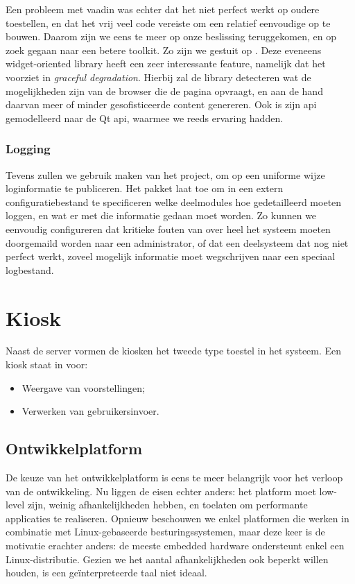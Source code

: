 Een probleem met vaadin was echter dat het niet perfect werkt op oudere toestellen, en dat het vrij veel code vereiste om een relatief eenvoudige  op te bouwen. Daarom zijn we eens te meer op onze beslissing teruggekomen, en op zoek gegaan naar een betere toolkit. Zo zijn we gestuit op . Deze eveneens widget-oriented library heeft een zeer interessante feature, namelijk dat het voorziet in \emph{graceful degradation}. Hierbij zal de library detecteren wat de mogelijkheden zijn van de browser die de pagina opvraagt, en aan de hand daarvan meer of minder gesofisticeerde content genereren. Ook is zijn \ac{api} gemodelleerd naar de Qt \ac{api}, waarmee we reeds ervaring hadden. 

\subsubsection{Logging}

Tevens zullen we gebruik maken van het  project, om op een uniforme wijze loginformatie te publiceren. Het pakket laat toe om in een extern configuratiebestand te specificeren welke deelmodules hoe gedetailleerd moeten loggen, en wat er met die informatie gedaan moet worden. Zo kunnen we eenvoudig configureren dat kritieke fouten van over heel het systeem moeten doorgemaild worden naar een administrator, of dat een deelsysteem dat nog niet perfect werkt, zoveel mogelijk informatie moet wegschrijven naar een speciaal logbestand.

\section{Kiosk}
\label{ontwerp:applicatie:kiosk}

Naast de server vormen de kiosken het tweede type toestel in het systeem. Een kiosk staat in voor:
\begin{itemize}
\item Weergave van voorstellingen;
\item Verwerken van gebruikersinvoer.
\end{itemize}

\subsection{Ontwikkelplatform}

De keuze van het ontwikkelplatform is eens te meer belangrijk voor het verloop van de ontwikkeling. Nu liggen de eisen echter anders: het platform moet low-level zijn, weinig afhankelijkheden hebben, en toelaten om performante applicaties te realiseren. Opnieuw beschouwen we enkel platformen die werken in combinatie met Linux-gebaseerde besturingssystemen, maar deze keer is de motivatie erachter anders: de meeste embedded hardware ondersteunt enkel een Linux-distributie. Gezien we het aantal afhankelijkheden ook beperkt willen houden, is een geïnterpreteerde taal niet ideaal.

